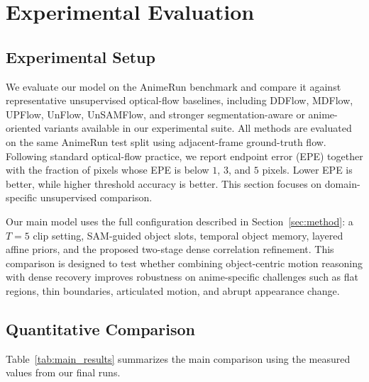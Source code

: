 
\section{Experimental Evaluation}
\label{sec:eval}

\subsection{Experimental Setup}

We evaluate our model on the AnimeRun benchmark and compare it against representative unsupervised optical-flow baselines, including DDFlow, MDFlow, UPFlow, UnFlow, UnSAMFlow, and stronger segmentation-aware or anime-oriented variants available in our experimental suite. All methods are evaluated on the same AnimeRun test split using adjacent-frame ground-truth flow. Following standard optical-flow practice, we report endpoint error (EPE) together with the fraction of pixels whose EPE is below $1$, $3$, and $5$ pixels. Lower EPE is better, while higher threshold accuracy is better. This section focuses on domain-specific unsupervised comparison.

Our main model uses the full configuration described in Section~\ref{sec:method}: a $T{=}5$ clip setting, SAM-guided object slots, temporal object memory, layered affine priors, and the proposed two-stage dense correlation refinement. This comparison is designed to test whether combining object-centric motion reasoning with dense recovery improves robustness on anime-specific challenges such as flat regions, thin boundaries, articulated motion, and abrupt appearance change.

\subsection{Quantitative Comparison}

Table~\ref{tab:main_results} summarizes the main comparison using the measured values from our final runs.


